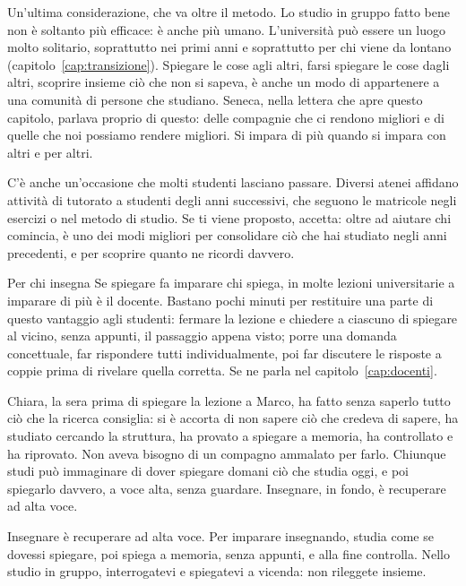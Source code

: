 Un'ultima considerazione, che va oltre il metodo. Lo studio in gruppo
fatto bene non è soltanto più efficace: è anche più umano. L'università
può essere un luogo molto solitario, soprattutto nei primi anni e
soprattutto per chi viene da lontano (capitolo~\ref{cap:transizione}).
Spiegare le cose agli altri, farsi spiegare le cose dagli altri,
scoprire insieme ciò che non si sapeva, è anche un modo di appartenere
a una comunità di persone che studiano. Seneca, nella lettera che apre
questo capitolo, parlava proprio di questo: delle compagnie che ci
rendono migliori e di quelle che noi possiamo rendere migliori. Si
impara di più quando si impara con altri e per altri.

C'è anche un'occasione che molti studenti lasciano passare. Diversi
atenei affidano attività di tutorato a studenti degli anni successivi,
che seguono le matricole negli esercizi o nel metodo di studio. Se ti
viene proposto, accetta: oltre ad aiutare chi comincia, è uno dei modi
migliori per consolidare ciò che hai studiato negli anni precedenti, e
per scoprire quanto ne ricordi davvero.

\begin{riquadro}{Per chi insegna}
Se spiegare fa imparare chi spiega, in molte lezioni universitarie a
imparare di più è il docente. Bastano pochi minuti per restituire una
parte di questo vantaggio agli studenti: fermare la lezione e chiedere
a ciascuno di spiegare al vicino, senza appunti, il passaggio appena
visto; porre una domanda concettuale, far rispondere tutti
individualmente, poi far discutere le risposte a coppie prima di
rivelare quella corretta. Se ne parla nel capitolo~\ref{cap:docenti}.
\end{riquadro}

\asterismo

Chiara, la sera prima di spiegare la lezione a Marco, ha fatto senza
saperlo tutto ciò che la ricerca consiglia: si è accorta di non sapere
ciò che credeva di sapere, ha studiato cercando la struttura, ha provato
a spiegare a memoria, ha controllato e ha riprovato. Non aveva bisogno
di un compagno ammalato per farlo. Chiunque studi può immaginare di
dover spiegare domani ciò che studia oggi, e poi spiegarlo davvero, a
voce alta, senza guardare. Insegnare, in fondo, è recuperare ad alta
voce.

\begin{daricordare}
Insegnare è recuperare ad alta voce. Per imparare insegnando, studia
come se dovessi spiegare, poi spiega a memoria, senza appunti, e alla
fine controlla. Nello studio in gruppo, interrogatevi e spiegatevi a
vicenda: non rileggete insieme.
\end{daricordare}

